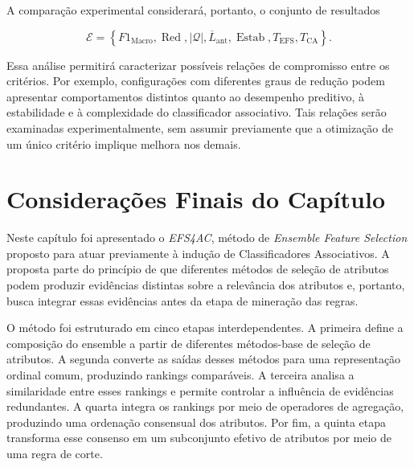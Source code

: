 A comparação experimental considerará, portanto, o conjunto de resultados

\begin{equation}
    \mathcal{E}
    =
    \left\{
        F1_{\mathrm{Macro}},
        \operatorname{Red},
        |\mathcal{Q}|,
        \overline{L}_{\mathrm{ant}},
        \operatorname{Estab},
        T_{\mathrm{EFS}},
        T_{\mathrm{CA}}
    \right\}.
    \label{eq:criterios-avaliacao-ac-efs}
\end{equation}

Essa análise permitirá caracterizar possíveis relações de compromisso entre
os critérios. Por exemplo, configurações com diferentes graus de redução podem
apresentar comportamentos distintos quanto ao desempenho preditivo, à
estabilidade e à complexidade do classificador associativo. Tais relações
serão examinadas experimentalmente, sem assumir previamente que a otimização
de um único critério implique melhora nos demais.

\section{Considerações Finais do Capítulo}
\label{sec:ac-efs-consideracoes}

Neste capítulo foi apresentado o \textit{EFS4AC}, método de
\textit{Ensemble Feature Selection} proposto para atuar previamente à indução
de Classificadores Associativos. A proposta parte do princípio de que
diferentes métodos de seleção de atributos podem produzir evidências distintas
sobre a relevância dos atributos e, portanto, busca integrar essas evidências
antes da etapa de mineração das regras.

O método foi estruturado em cinco etapas interdependentes. A primeira define
a composição do ensemble a partir de diferentes métodos-base de seleção de
atributos. A segunda converte as saídas desses métodos para uma representação
ordinal comum, produzindo rankings comparáveis. A terceira analisa a
similaridade entre esses rankings e permite controlar a influência de
evidências redundantes. A quarta integra os rankings por meio de operadores de
agregação, produzindo uma ordenação consensual dos atributos. Por fim, a quinta
etapa transforma esse consenso em um subconjunto efetivo de atributos por meio
de uma regra de corte.

